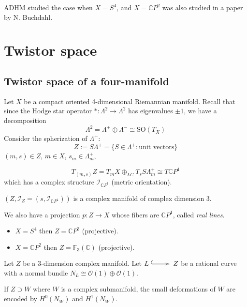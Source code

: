 ADHM studied the case when $X=S^4$,
and $X=\mathbb{C}P^2$ was also studied in a
paper by N. Buchdahl.

\section{Twistor space}
\label{section-twistor-space}

\subsection{Twistor space of a four-manifold}
\label{subsection-twistor-four-manifold}

\noindent

Let $X$ be a compact oriented 4-dimensional
Riemannian manifold. Recall that since the
Hodge star operator $*:\Lambda^2\to\Lambda^2$
has eigenvalues $\pm 1$, we have a
decomposition
$$
\Lambda^2=\Lambda^+ \oplus \Lambda^- \cong
\text{SO}(T_X)
$$
Consider the spherization of $\Lambda^+$:
$$
Z:=S\Lambda^+=\{S \in \Lambda^+:\text{unit
vectors}\}
$$
$(m,s) \in Z$, $m \in X$, $s_m \in
\Lambda^+_m$,

$$
T_{(m,s)}Z=
T_mX \oplus_{LC}T_sS \Lambda^+_m
\cong T\mathbb{C}P^1
$$
which has a complex structure
$\mathcal{I}_{\mathbb{C}P^1}$
(metric orientation).

\begin{theorem}
\label{theorem-twistor-space}
$(Z,\mathcal{I}_Z=(s,\mathcal{I}_{\mathbb{C}
P^1}))$
is a complex manifold of complex dimension 3.
\end{theorem}

\noindent
We also have a projection $p:Z \to X $
whose fibers are $\mathbb{C}P^1$,
called {\it real lines}.

\begin{example}
\label{example-twistor-space}
\begin{itemize}
\item $X=S^4$ then $Z=\mathbb{C}P^3$
(projective).
\item $X=\mathbb{C}P^2$ then
$Z=\mathbb{F}_3(\mathbb{C})$ (projective).
\end{itemize}
\end{example}

Let $Z$ be a 3-dimension complex manifold.
Let $L \xymatrix{\ar@{^{(}->}[r]&} Z$
be a rational curve with a normal bundle
$N_L \cong \mathcal{O}(1) \oplus
\mathcal{O}(1)$.

\begin{remark}
\label{remark-small-deformations}
If $Z \supset W$ where $W$ is a complex
submanifold,
the small deformations of $W$ are encoded by
$H^0(N_W)$ and $H^1(N_W)$.
\end{remark}

